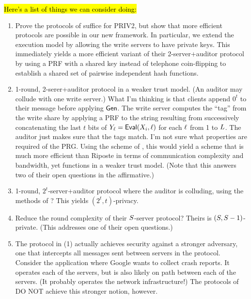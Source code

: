 \noindent\hl{Here's a list of things we can consider doing:}
\begin{enumerate}
  \item Prove the protocols of \cite{riposte} suffice for PRIV2, but show that
    more efficient protocols are possible in our new framework. In particular,
    we extend the execution model by allowing the write servers to have private
    keys. This immediately yields a more efficient variant of their
    2-server+auditor protocol by using a PRF with a shared key instead of
    telephone coin-flipping to establish a shared set of pairwise independent
    hash functions.

  \item 1-round, 2-serer+auditor protocol in a weaker trust model. (An auditor
    may collude with one write server.) What I'm thinking is that clients append
    $0^t$ to their message before applying $\mathsf{Gen}$. The write server computes the
    ``tag'' from the write share by applying a PRF to the string resulting from
    successively concatenating the last $t$ bits of $Y_\ell = \mathsf{Eval}(X_i, \ell)$
    for each $\ell$ from 1 to $L$. The auditor just makes sure that the tags
    match. I'm not sure what properties are required of the PRG. Using the
    scheme of \cite{dpf}, this would yield a scheme that is much more efficient
    than Riposte in terms of communication complexity and bandwidth, yet
    functions in a weaker trust model. (Note that this answers two of their open
    questions in the affirmative.)

  \item 1-round, $2^t$-server+auditor protocol where the auditor is colluding,
    using the methods of \cite{dpf-multi-server}? This yields $(2^t,
    t)$-privacy.

  \item Reduce the round complexity of their $S$-server protocol? Theirs
    is $(S, S-1)$-private. (This addresses one of their open
    questions.)

  \item The protocol in (1) actually achieves security against a stronger
    adversary, one that intercepts all messages sent between servers in the
    protocol. Consider the application where Google wants to collect crash
    reports. It operates each of the servers, but is also likely on path between
    each of the servers. (It probably operates the network infrastructure!)
    The protocols of \cite{riposte} DO NOT achieve this stronger notion,
    however.
\end{enumerate}
